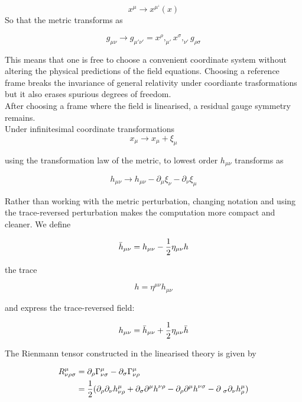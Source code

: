 \documentclass[binding=0.6cm, LaM]{sapthesis}
\begin{document}
		\begin{equation}
		x^{\mu} \rightarrow x^{\mu ‘}(x)
		\end{equation}
	So that the metric transforms as

		\begin{equation}
		g_{\mu\nu} \rightarrow g_{\mu' \nu'} = x^{\rho},_{\mu'}x^{\sigma},_{\nu'}g_{\rho \sigma}
		\end{equation}

	This means that one is free to choose a convenient coordinate system without 
	altering the physical predictions of the field equations.
	Choosing a reference frame breaks the invariance of general relativity under 
	coordiante trasformations but it also erases spurious degrees of freedom. \\
	After choosing a frame where the field is linearised, 
	a residual gauge symmetry remains. \\
	Under infinitesimal coordinate transformations
                 \[
		x_{\mu} \rightarrow x_{\mu} + \xi_{\mu}
                \]

	using the transformation law of the metric, to lowest order $h_{\mu\nu}$ transforms as
			
		\[
		h_{\mu\nu} \rightarrow h_{\mu\nu} - \partial_{\mu}\xi_{\nu} - \partial_{\nu}\xi_{\mu}
		\]

	Rather than working with the metric perturbation, changing notation and using the trace-reversed perturbation 
	makes the computation more compact and cleaner. We define
	
		\begin{equation}
		{\bar h}_{\mu\nu} = h_{\mu\nu} - {1 \over {2}}\eta_{\mu\nu}h  
		\end{equation}

	the trace
	
		\begin{equation}
		h = \eta^{\mu\nu}h_{\mu\nu}
		\end{equation}

	and express the trace-reversed field:

		\begin{equation}
		h_{\mu\nu} = {\bar h}_{\mu\nu} + {1 \over {2}}\eta_{\mu\nu}{\bar h}
		\end{equation}

	The Rienmann tensor constructed in the linearised theory is given by

		\begin{align}
		R^{\mu}_{\nu\rho\sigma} &= \partial_{\rho} \Gamma^{\mu}_{\nu\sigma} - \partial_{\sigma}\Gamma^{\mu}_{\nu\rho}  \\
				       &= {1 \over 2} (\partial_{\rho}\partial_{\nu}h^{\mu}_{\nu\rho} + \partial_{\sigma}\partial^{\mu}h^{\nu\rho} - \partial_{\rho}\partial^{\mu}h^{\nu\sigma} - \partial_{\					     \sigma}\partial_{\nu}h^{\mu}_{\rho})
		\end{align}
\end{document}
